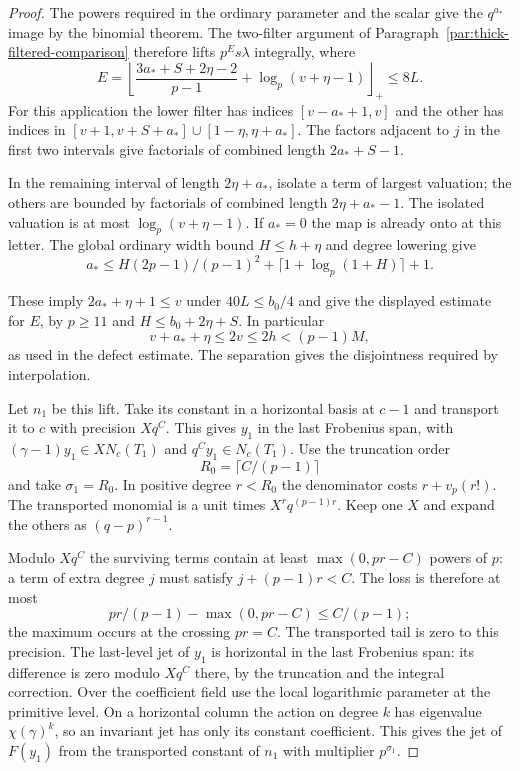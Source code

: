 \begin{proof}
The powers required in the ordinary parameter and the scalar
give the \(q^{a_*}\) image by the binomial theorem.
The two-filter argument of Paragraph~\ref{par:thick-filtered-comparison}
therefore lifts \(p^E s\lambda\) integrally, where
\[
 E=\left\lfloor\frac{3a_*+S+2\eta-2}{p-1}
               +\log_p(v+\eta-1)\right\rfloor_{\!+}\le8L .
\]
For this application the lower filter has indices \([v-a_*+1,v]\)
and the other has indices in \([v+1,v+S+a_*]\cup[1-\eta,\eta+a_*]\).
The factors adjacent to \(j\) in the first two intervals
give factorials of combined length \(2a_*+S-1\).

In the remaining
interval of length \(2\eta+a_*\), isolate a term of largest
valuation; the others are bounded by factorials of combined
length \(2\eta+a_*-1\). The isolated valuation is at most
\(\log_p(v+\eta-1)\). If \(a_*=0\) the map is already onto
at this letter. The global ordinary width bound \(H\le h+\eta\)
and degree lowering give
\[
 a_*\le H(2p-1)/(p-1)^2+\lceil1+\log_p(1+H)\rceil+1.
\]

These imply \(2a_*+\eta+1\le v\) under \(40L\le b_0/4\)
and give the displayed estimate for \(E\), by \(p\ge11\) and
\(H\le b_0+2\eta+S\). In particular
\[
 v+a_*+\eta\le2v\le2h<(p-1)M,
\]
as used in the defect estimate. The separation gives the
disjointness required by interpolation. \label{cor:inert-short-three-1}

Let \(n_1\) be this lift. Take its constant in a horizontal
basis at \(c-1\) and transport it to \(c\) with precision
\(Xq^C\). This gives \(y_1\) in the last Frobenius span,
with \((\gamma-1)y_1\in XN_c(T_1)\) and \(q^C y_1\in N_c(T_1)\).
Use the truncation order
\[
 R_0=\lceil C/(p-1)\rceil
\]
and
take \(\sigma_1=R_0\). In positive degree \(r<R_0\) the
denominator costs \(r+v_p(r!)\). The transported monomial is
a unit times \(X^r q^{(p-1)r}\). Keep one \(X\) and expand
the others as \((q-p)^{r-1}\).

Modulo \(Xq^C\) the surviving
terms contain at least \(\max(0,pr-C)\) powers of \(p\):
a term of extra degree \(j\) must satisfy \(j+(p-1)r<C\).
The loss is therefore at most
\[
 pr/(p-1)-\max(0,pr-C)\le C/(p-1);
\]
the maximum occurs at the crossing \(pr=C\). The transported
tail is zero to this precision. The last-level jet of \(y_1\)
is horizontal in the last Frobenius span: its difference is
zero modulo \(Xq^C\) there, by the truncation and the integral
correction. Over the coefficient field use the local logarithmic
parameter at the primitive level. On a horizontal column the
action on degree \(k\) has eigenvalue \(\chi(\gamma)^k\), so
an invariant jet has only its constant coefficient. This gives
the jet of \(F(y_1)\) from the transported constant of \(n_1\)
with multiplier \(p^{\sigma_1}\).


\end{proof}

